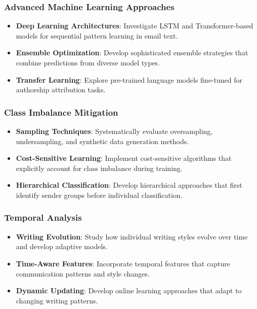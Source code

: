 \documentclass[11pt,a4paper]{article}
\begin{document}
\subsubsection{Advanced Machine Learning Approaches}

\begin{itemize}
    \item \textbf{Deep Learning Architectures}: Investigate LSTM and Transformer-based models for sequential pattern learning in email text.
    
    \item \textbf{Ensemble Optimization}: Develop sophisticated ensemble strategies that combine predictions from diverse model types.
    
    \item \textbf{Transfer Learning}: Explore pre-trained language models fine-tuned for authorship attribution tasks.
\end{itemize}

\subsubsection{Class Imbalance Mitigation}

\begin{itemize}
    \item \textbf{Sampling Techniques}: Systematically evaluate oversampling, undersampling, and synthetic data generation methods.
    
    \item \textbf{Cost-Sensitive Learning}: Implement cost-sensitive algorithms that explicitly account for class imbalance during training.
    
    \item \textbf{Hierarchical Classification}: Develop hierarchical approaches that first identify sender groups before individual classification.
\end{itemize}

\subsubsection{Temporal Analysis}

\begin{itemize}
    \item \textbf{Writing Evolution}: Study how individual writing styles evolve over time and develop adaptive models.
    
    \item \textbf{Time-Aware Features}: Incorporate temporal features that capture communication patterns and style changes.
    
    \item \textbf{Dynamic Updating}: Develop online learning approaches that adapt to changing writing patterns.
\end{itemize}
\end{document}
